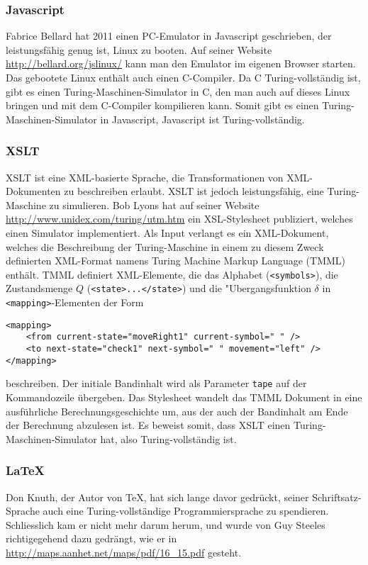 \subsubsection{Javascript}
Fabrice Bellard hat 2011 einen PC-Emulator in Javascript geschrieben, der
leistungsfähig genug ist, Linux zu booten. Auf seiner Website
\url{http://bellard.org/jslinux/} kann man den Emulator im eigenen Browser
starten. Das gebootete Linux enthält auch einen C-Compiler. Da C
Turing-vollständig ist, gibt es einen Turing-Maschinen-Simulator in
C, den man auch auf dieses Linux bringen und mit dem C-Compiler
kompilieren kann. Somit gibt es einen Turing-Maschinen-Simulator in
Javascript, Javascript ist Turing-vollständig.

\subsubsection{XSLT}
XSLT ist eine XML-basierte Sprache, die Transformationen von XML-Dokumenten
zu beschreiben erlaubt. XSLT ist jedoch leistungsfähig, eine Turing-Maschine
zu simulieren. Bob Lyons hat auf seiner Website
\url{http://www.unidex.com/turing/utm.htm} ein XSL-Stylesheet publiziert,
welches einen Simulator implementiert. Als Input verlangt es
ein
XML-Dokument, welches die Beschreibung der Turing-Maschine in einem
zu diesem Zweck definierten XML-Format namens Turing Machine Markup
Language (TMML) enthält. TMML definiert XML-Elemente, die das Alphabet
(\verb+<symbols>+),
die Zustandsmenge $Q$ (\verb+<state>...</state>+)
und die "Ubergangsfunktion $\delta$ in \verb+<mapping>+-Elementen
der Form
\begin{verbatim}
<mapping>
    <from current-state="moveRight1" current-symbol=" " />
    <to next-state="check1" next-symbol=" " movement="left" />
</mapping>
\end{verbatim}
beschreiben. Der initiale Bandinhalt wird als Parameter \verb+tape+
auf der Kommandozeile übergeben.
Das Stylesheet wandelt das TMML Dokument in eine ausführliche
Berechnungsgeschichte um, aus der auch der Bandinhalt am Ende der Berechnung
abzulesen ist. Es beweist somit, dass XSLT einen Turing-Maschinen-Simulator
hat, also Turing-vollständig ist.

\subsubsection{\LaTeX}
Don Knuth, der Autor von \TeX, hat sich lange davor gedrückt, seiner
Schriftsatz-Sprache auch eine Turing-vollständige Programmiersprache
zu spendieren. Schliesslich kam er nicht mehr darum herum, und wurde
von Guy Steeles richtigegehend dazu gedrängt, wie er in
\url{http://maps.aanhet.net/maps/pdf/16\_15.pdf}
gesteht.

